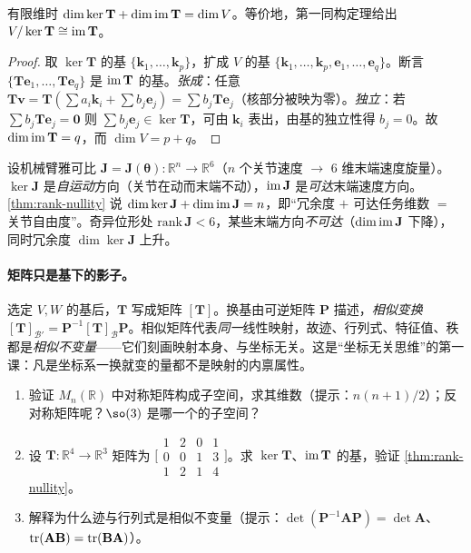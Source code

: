 \begin{theorem}[秩--零度定理]\label{thm:rank-nullity}
有限维时 $\dim\ker\mathbf{T}+\dim\operatorname{im}\mathbf{T}=\dim V$。等价地，第一同构定理给出 $V/\ker\mathbf{T}\cong\operatorname{im}\mathbf{T}$。
\end{theorem}
\begin{proof}
取 $\ker\mathbf{T}$ 的基 $\{\mathbf{k}_1,\dots,\mathbf{k}_p\}$，扩成 $V$ 的基 $\{\mathbf{k}_1,\dots,\mathbf{k}_p,\mathbf{e}_1,\dots,\mathbf{e}_q\}$。断言 $\{\mathbf{T}\mathbf{e}_1,\dots,\mathbf{T}\mathbf{e}_q\}$ 是 $\operatorname{im}\mathbf{T}$ 的基。\emph{张成}：任意 $\mathbf{T}\mathbf{v}=\mathbf{T}(\sum a_i\mathbf{k}_i+\sum b_j\mathbf{e}_j)=\sum b_j\mathbf{T}\mathbf{e}_j$（核部分被映为零）。\emph{独立}：若 $\sum b_j\mathbf{T}\mathbf{e}_j=\mathbf{0}$ 则 $\sum b_j\mathbf{e}_j\in\ker\mathbf{T}$，可由 $\mathbf{k}_i$ 表出，由基的独立性得 $b_j=0$。故 $\dim\operatorname{im}\mathbf{T}=q$，而 $\dim V=p+q$。
\end{proof}

\begin{example}[秩--零度即“冗余度 + 任务维数 = 关节数”]\label{ex:rank-nullity-robot}
设机械臂雅可比 $\mathbf{J}=\mathbf{J}(\boldsymbol{\theta}):\mathbb{R}^n\to\mathbb{R}^6$（$n$ 个关节速度 $\to$ 6 维末端速度旋量）。$\ker\mathbf{J}$ 是\emph{自运动}方向（关节在动而末端不动），$\operatorname{im}\mathbf{J}$ 是\emph{可达}末端速度方向。\cref{thm:rank-nullity} 说 $\dim\ker\mathbf{J}+\dim\operatorname{im}\mathbf{J}=n$，即“冗余度 $+$ 可达任务维数 $=$ 关节自由度”。奇异位形处 $\mathrm{rank}\,\mathbf{J}<6$，某些末端方向\emph{不可达}（$\dim\operatorname{im}\mathbf{J}$ 下降），同时冗余度 $\dim\ker\mathbf{J}$ 上升。
\end{example}

\paragraph{矩阵只是基下的影子。}
选定 $V,W$ 的基后，$\mathbf{T}$ 写成矩阵 $[\mathbf{T}]$。换基由可逆矩阵 $\mathbf{P}$ 描述，\emph{相似变换} $[\mathbf{T}]_{\mathcal{B}'}=\mathbf{P}^{-1}[\mathbf{T}]_{\mathcal{B}}\mathbf{P}$。相似矩阵代表\emph{同一}线性映射，故迹、行列式、特征值、秩都是\emph{相似不变量}——它们刻画映射本身、与坐标无关。这是“坐标无关思维”的第一课：凡是坐标系一换就变的量都不是映射的内禀属性。

\begin{practice}
\begin{enumerate}
  \item 验证 $M_{n}(\mathbb{R})$ 中对称矩阵构成子空间，求其维数（提示：$n(n+1)/2$）；反对称矩阵呢？$\so(3)$ 是哪一个的子空间？
  \item 设 $\mathbf{T}:\mathbb{R}^4\to\mathbb{R}^3$ 矩阵为 $\bigl[\begin{smallmatrix}1&2&0&1\\0&0&1&3\\1&2&1&4\end{smallmatrix}\bigr]$。求 $\ker\mathbf{T}$、$\operatorname{im}\mathbf{T}$ 的基，验证 \cref{thm:rank-nullity}。
  \item 解释为什么迹与行列式是相似不变量（提示：$\det(\mathbf{P}^{-1}\mathbf{A}\mathbf{P})=\det\mathbf{A}$、$\operatorname{tr}(\mathbf{A}\mathbf{B})=\operatorname{tr}(\mathbf{B}\mathbf{A})$）。
\end{enumerate}
\end{practice}

